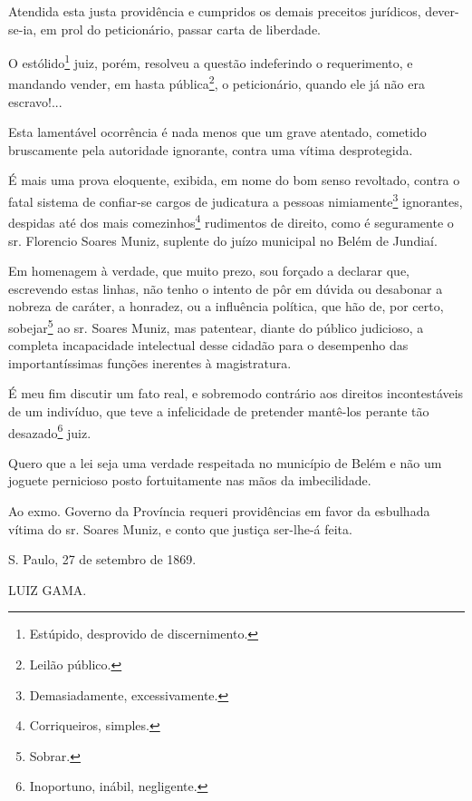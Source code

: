 Atendida esta justa providência e cumpridos os demais preceitos
jurídicos, dever-se-ia, em prol do peticionário, passar carta de
liberdade.

O estólido\footnote{Estúpido, desprovido de discernimento.} juiz,
porém, resolveu a questão indeferindo o requerimento, e mandando vender,
em hasta pública\footnote{Leilão público.}, o peticionário, quando ele
já não era escravo!...

Esta lamentável ocorrência é nada menos que um grave atentado, cometido
bruscamente pela autoridade ignorante, contra uma vítima desprotegida.

É mais uma prova eloquente, exibida, em nome do bom senso revoltado,
contra o fatal sistema de confiar-se cargos de judicatura a pessoas
nimiamente\footnote{Demasiadamente, excessivamente.} ignorantes,
despidas até dos mais comezinhos\footnote{Corriqueiros, simples.}
rudimentos de direito, como é seguramente o sr. Florencio Soares Muniz,
suplente do juízo municipal no Belém de Jundiaí.

Em homenagem à verdade, que muito prezo, sou forçado a declarar que,
escrevendo estas linhas, não tenho o intento de pôr em dúvida ou
desabonar a nobreza de caráter, a honradez, ou a influência política,
que hão de, por certo, sobejar\footnote{Sobrar.} ao sr. Soares Muniz,
mas patentear, diante do público judicioso, a completa incapacidade
intelectual desse cidadão para o desempenho das importantíssimas funções
inerentes à magistratura.

É meu fim discutir um fato real, e sobremodo contrário aos direitos
incontestáveis de um indivíduo, que teve a infelicidade de pretender
mantê-los perante tão desazado\footnote{Inoportuno, inábil,
  negligente.} juiz.

Quero que a lei seja uma verdade respeitada no município de Belém e não
um joguete pernicioso posto fortuitamente nas mãos da imbecilidade.

Ao exmo. Governo da Província requeri providências em favor da esbulhada
vítima do sr. Soares Muniz, e conto que justiça ser-lhe-á feita.

S. Paulo, 27 de setembro de 1869.

LUIZ GAMA.

\pagebreak
\mbox{}\vfill
\thispagestyle{empty}

